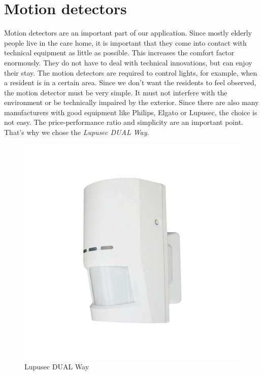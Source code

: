 \section{Motion detectors}
Motion detectors are an important part of our application. Since mostly elderly people live in the care home, it is important that they come into contact with technical equipment as little as possible. This increases the comfort factor enormously. They do not have to deal with technical innovations, but can enjoy their stay. The motion detectors are required to control lights, for example, when a resident is in a certain area. Since we don't want the residents to feel observed, the motion detector must be very simple. It must not interfere with the environment or be technically impaired by the exterior. Since there are also many manufacturers with good equipment like Philips, Elgato or Lupusec, the choice is not easy. The price-performance ratio and simplicity are an important point. That's why we chose the \textit{Lupusec DUAL Way}.
\begin{figure}[h]
	\centering
	\includegraphics[width=.4\textwidth, trim=3cm 3cm 3cm 4cm, clip]{images/CostAnalysis/lupusecBewegungsmelder} 
	\caption[Lupusec DUAL Way]{Lupusec DUAL Way\footnotemark}
	\label{fig:lupusecDual}
\end{figure}
